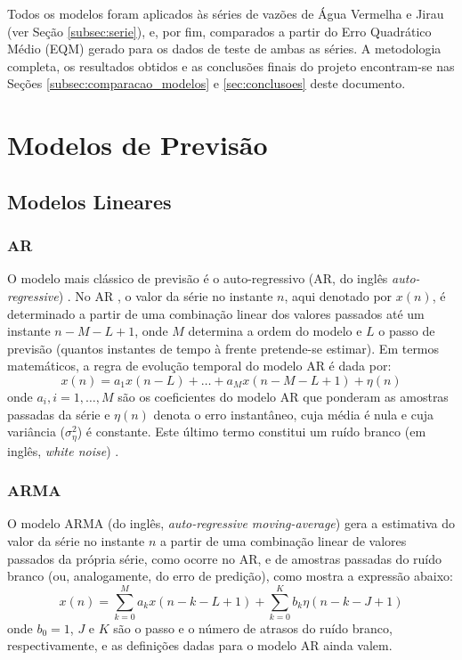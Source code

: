 \documentclass[a4paper]{article}
\begin{document}
\begin{multicols}{2}
    Todos os modelos foram aplicados às séries de vazões de Água Vermelha e Jirau (ver Seção \ref{subsec:serie}), e, por fim, comparados a partir do Erro Quadrático Médio (EQM) gerado para os dados de teste de ambas as séries. A metodologia completa, os resultados obtidos e as conclusões finais do projeto encontram-se nas Seções \ref{subsec:comparacao_modelos} e \ref{sec:conclusoes} deste documento.

\section{Modelos de Previsão}
\label{sec:modelos_nao_lineares}

\subsection{Modelos Lineares}

\subsubsection{AR} \label{subsubsec:AR_descricao}

O modelo mais clássico de previsão é o auto-regressivo (AR, do inglês \emph{auto-regressive}) \cite{Box-Jenkins,Haykin}.
    No AR , o valor da série no instante $n$, aqui denotado por $x(n)$, é determinado a partir de uma combinação linear dos valores passados até um instante $n-M-L+1$, onde $M$ determina a ordem do modelo e $L$ o passo de previsão (quantos instantes de tempo à frente pretende-se estimar). Em termos matemáticos, a regra de evolução temporal do modelo AR é dada por:
    \begin{equation}
        x(n) = a_1 x(n-L) + \ldots + a_M x(n-M-L+1) + \eta(n)
    \label{eq:ar}
    \end{equation}
    onde $a_i, i = 1,\ldots,M$ são os coeficientes do modelo AR que ponderam as amostras passadas da série e $\eta(n)$ denota o erro instantâneo, cuja média é nula e cuja variância ($\sigma_{\eta}^2$) é constante. Este último termo constitui um ruído branco (em inglês, \emph{white noise}) \cite{Box-Jenkins}.
    
\subsubsection{ARMA} \label{subsubsec:ARMA_descricao}
    
    O modelo ARMA (do inglês, \emph{auto-regressive moving-average}) \cite{Box-Jenkins, Haykin} gera a estimativa do valor da série no instante $n$ a partir de uma combinação linear de valores passados da própria série, como ocorre no AR, e de amostras passadas do ruído branco (ou, analogamente, do erro de predição), como mostra a expressão abaixo:
    \begin{equation}
        x(n) = \sum_{k=0}^{M} a_k x(n-k-L+1) + \sum_{k=0}^{K} b_k\eta(n-k-J+1)
    \label{eq:arma}
    \end{equation}
    onde $b_0 = 1$, $J$ e $K$ são o passo e o número de atrasos do ruído branco, respectivamente, e as definições dadas para o modelo AR ainda valem.
    

\end{multicols}
\end{document}
